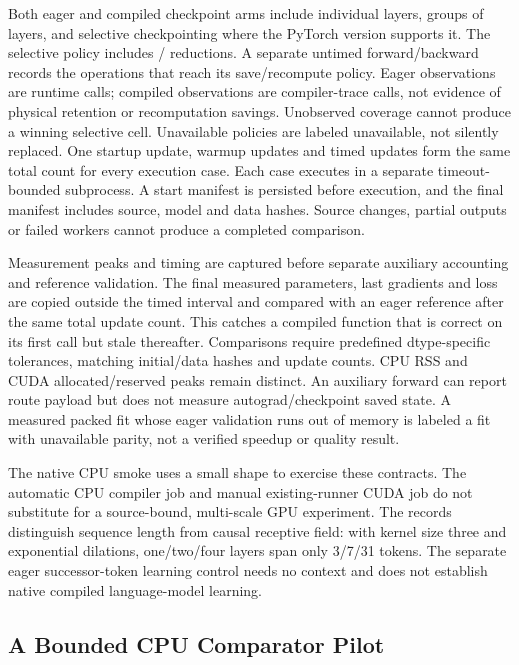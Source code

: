 Both eager and compiled checkpoint arms include individual layers, groups of
layers, and selective checkpointing where the PyTorch version supports it.
The selective policy includes / reductions. A separate
untimed forward/backward records the operations that reach its save/recompute
policy. Eager observations are runtime calls; compiled observations are
compiler-trace calls, not evidence of physical retention or recomputation
savings. Unobserved coverage cannot produce a winning selective cell.
Unavailable policies
are labeled unavailable, not silently replaced. One startup update, warmup
updates and timed updates form the same total count for every execution
case. Each case executes in a separate timeout-bounded subprocess. A start
manifest is persisted before execution, and the final manifest includes
source, model and data hashes. Source changes, partial outputs or failed
workers cannot produce a completed comparison.

Measurement peaks and timing are captured before separate auxiliary
accounting and reference validation. The final measured parameters, last
gradients and loss are copied outside the timed interval and compared with
an eager reference after the same total update count. This catches a
compiled function that is correct on its first call but stale thereafter.
Comparisons require predefined dtype-specific tolerances, matching
initial/data hashes and update counts. CPU RSS and CUDA allocated/reserved
peaks remain distinct. An auxiliary forward can report route payload but
does not measure autograd/checkpoint saved state. A measured packed fit
whose eager validation runs out of memory is labeled a fit with unavailable
parity, not a verified speedup or quality result.

The native CPU smoke uses a small shape to exercise these contracts.
The automatic CPU compiler job and manual existing-runner CUDA job do not
substitute for a source-bound, multi-scale GPU experiment.
The records distinguish sequence length from causal receptive field: with
kernel size three and exponential dilations, one/two/four layers span only
3/7/31 tokens. The separate eager successor-token learning control needs no
context and does not establish native compiled language-model learning.

\subsection{A Bounded CPU Comparator Pilot}
\label{app:cpu-pilot}

